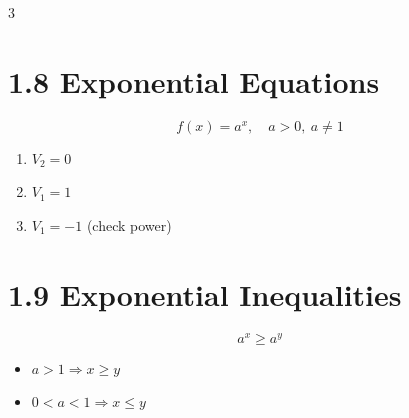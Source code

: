 \documentclass[11pt,a4paper,landscape]{article}
\begin{document}
\begin{multicols*}{3}
\section*{1.8 Exponential Equations}

$$
f(x) = a^x, \quad a>0,\ a\neq1
$$

\begin{enumerate}
\item $V_2 = 0$
\item $V_1 = 1$
\item $V_1 = -1$ (check power)
\end{enumerate}

\section*{1.9 Exponential Inequalities}

$$
a^x \ge a^y
$$

\begin{itemize}
\item $a>1 \Rightarrow x \ge y$
\item $0<a<1 \Rightarrow x \le y$
\end{itemize}

\end{multicols*}
\end{document}
